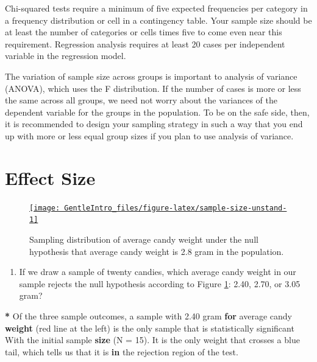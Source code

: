 \documentclass[a4paper]{book}
\newenvironment{Shaded}{\begin{snugshade}}{\end{snugshade}}
\newcommand{\KeywordTok}[1]{\textcolor[rgb]{0,0,0}{\textbf{#1}}}
\newcommand{\DataTypeTok}[1]{\textcolor[rgb]{0,0,0}{#1}}
\newcommand{\DecValTok}[1]{\textcolor[rgb]{0.00,0.00,0.00}{#1}}
\newcommand{\FloatTok}[1]{\textcolor[rgb]{0.00,0.00,0.00}{#1}}
\newcommand{\StringTok}[1]{\textcolor[rgb]{0.00,0.00,0.00}{#1}}
\newcommand{\ControlFlowTok}[1]{\textcolor[rgb]{0.00,0.00,0.00}{\textbf{#1}}}
\newcommand{\OperatorTok}[1]{\textcolor[rgb]{0.00,0.00,0.00}{\textbf{#1}}}
\newcommand{\NormalTok}[1]{#1}
\providecommand{\tightlist}{%
  \setlength{\itemsep}{0pt}\setlength{\parskip}{0pt}}
\theoremstyle{definition}
\theoremstyle{definition}
\theoremstyle{definition}
\theoremstyle{remark}
\begin{document}
Chi-squared tests require a minimum of five expected frequencies per
category in a frequency distribution or cell in a contingency table.
Your sample size should be at least the number of categories or cells
times five to come even near this requirement. Regression analysis
requires at least 20 cases per independent variable in the regression
model.

The variation of sample size across groups is important to analysis of
variance (ANOVA), which uses the F distribution. If the number of cases
is more or less the same across all groups, we need not worry about the
variances of the dependent variable for the groups in the population. To
be on the safe side, then, it is recommended to design your sampling
strategy in such a way that you end up with more or less equal group
sizes if you plan to use analysis of variance.

\section{Effect Size}\label{effectsize}

\begin{figure}[H]
\href{http://82.196.4.233:3838/apps/sample-size-unstand/}{\texttt{[image: GentleIntro\_files/figure-latex/sample-size-unstand-1]} }\caption{Sampling distribution of average candy weight under the null hypothesis that average candy weight is 2.8 gram in the population.}\label{fig:sample-size-unstand}
\end{figure}

\begin{enumerate}
\def\labelenumi{\arabic{enumi}.}
\tightlist
\item
  If we draw a sample of twenty candies, which average candy weight in
  our sample rejects the null hypothesis according to Figure
  \ref{fig:sample-size-unstand}: 2.40, 2.70, or 3.05 gram?
\end{enumerate}

\begin{Shaded}
\begin{Highlighting}[]
\OperatorTok{*}\StringTok{ }\NormalTok{Of the three sample outcomes, a sample with }\FloatTok{2.40}\NormalTok{ gram }\ControlFlowTok{for}\NormalTok{ average candy}
\KeywordTok{weight}\NormalTok{ (red line at the left) is the only sample that is statistically}
\NormalTok{significant With the initial sample }\KeywordTok{size}\NormalTok{ (}\DataTypeTok{N =} \DecValTok{15}\NormalTok{). It is the only weight that}
\NormalTok{crosses a blue tail, which tells us that it is }\ControlFlowTok{in}\NormalTok{ the rejection region of the}
\NormalTok{test.}
\end{Highlighting}
\end{Shaded}
\end{document}
